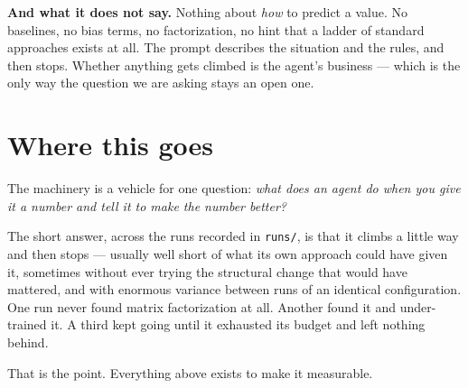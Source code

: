 \documentclass[11pt]{article}
\newcommand{\runin}[1]{\smallskip\noindent\textbf{#1}\quad}
\begin{document}
\runin{And what it does not say.}
Nothing about \emph{how} to predict a value. No baselines, no bias terms, no factorization, no
hint that a ladder of standard approaches exists at all. The prompt describes the situation and
the rules, and then stops. Whether anything gets climbed is the agent's business --- which is the
only way the question we are asking stays an open one.

\section{Where this goes}

The machinery is a vehicle for one question: \emph{what does an agent do when you give it a
number and tell it to make the number better?}

The short answer, across the runs recorded in \texttt{runs/}, is that it
climbs a little way and then stops --- usually well short of what its own approach could have
given it, sometimes without ever trying the structural change that would have mattered, and with
enormous variance between runs of an identical configuration. One run never found matrix
factorization at all. Another found it and under-trained it. A third kept going until it
exhausted its budget and left nothing behind.

That is the point. Everything above exists to make it measurable.
\end{document}
